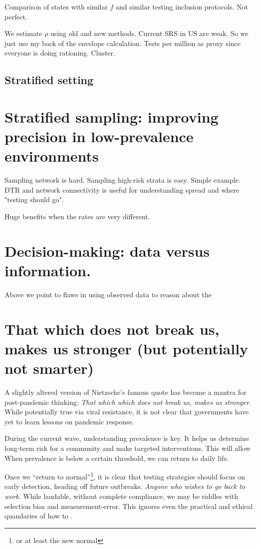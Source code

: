 \documentclass[11pt]{amsart}
\begin{document}
Comparison of states with similar $f$ and similar testing inclusion protocols.  Not perfect.

We estimate $\rho$ using old and new methods.  Current SRS in US are weak.  So we just use my back of the envelope calculation. Tests per million as proxy since everyone is doing rationing. Cluster.


\subsection{Stratified setting}


\section{Stratified sampling: improving precision in low-prevalence environments}

Sampling network is hard.  Sampling high-risk strata is easy.  Simple example.
DTR and network connectivity is useful for understanding spread and where "testing should go".

Huge benefits when the rates are very different.

\section{Decision-making: data versus information.}

Above we point to flaws in using observed data to reason about the

\section{That which does not break us, makes us stronger (but potentially not smarter)}

A slightly altered version of Nietzsche's famous quote has become a mantra for post-pandemic thinking: \emph{That which which does not break us, makes us stronger}.  While potentially true via viral resistance, it is not clear that governments have yet to learn lessons on pandemic response.

During the current wave, understanding prevalence is key.  It helps us determine long-term risk for a community and make targeted interventions.  This will allow
When prevalence is below a certain threshold, we can return to daily life.

Once we ``return to normal''\footnote{or at least the new normal}, it is clear that testing strategies should focus on early detection, heading off future outbreaks.
\emph{Anyone who wishes to go back to work}.  While laudable, without complete compliance, we may be riddles with selection bias and measurement-error.  This ignores even the practical and ethical quandaries of how to .
\end{document}
